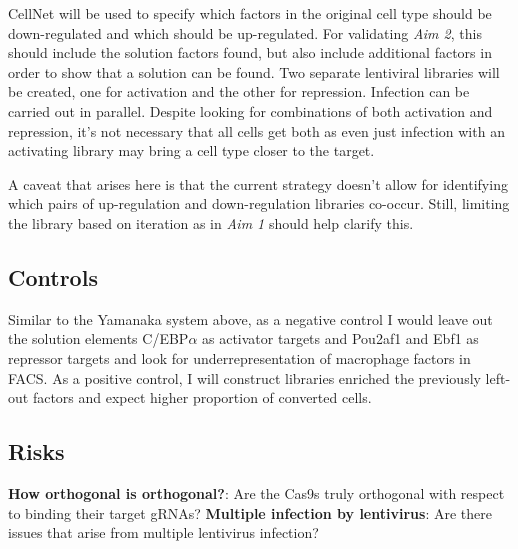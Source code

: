 \documentclass[10pt]{article}
\begin{document}
CellNet will be used to specify which factors in the original cell type should be down-regulated and which should be up-regulated. For validating \textit{Aim 2}, this should include the solution factors found, but also include additional factors in order to show that a solution can be found. Two separate lentiviral libraries will be created, one for activation and the other for repression. Infection can be carried out in parallel. Despite looking for combinations of both activation and repression, it's not necessary that all cells get both as even just infection with an activating library may bring a cell type closer to the target.

A caveat that arises here is that the current strategy doesn't allow for identifying which pairs of up-regulation and down-regulation libraries co-occur. Still, limiting the library based on iteration as in \textit{Aim 1} should help clarify this.

\subsection{Controls}

Similar to the Yamanaka system above, as a negative control I would leave out the solution elements C/EBP$\alpha$ as activator targets and Pou2af1 and Ebf1 as repressor targets and look for underrepresentation of macrophage factors in FACS. As a positive control, I will construct libraries enriched the previously left-out factors and expect higher proportion of converted cells.

\subsection{Risks}

\noindent \textbf{How orthogonal is orthogonal?}: Are the Cas9s truly orthogonal with respect to binding their target gRNAs?
\noindent \textbf{Multiple infection by lentivirus}: Are there issues that arise from multiple lentivirus infection?



\end{document}

